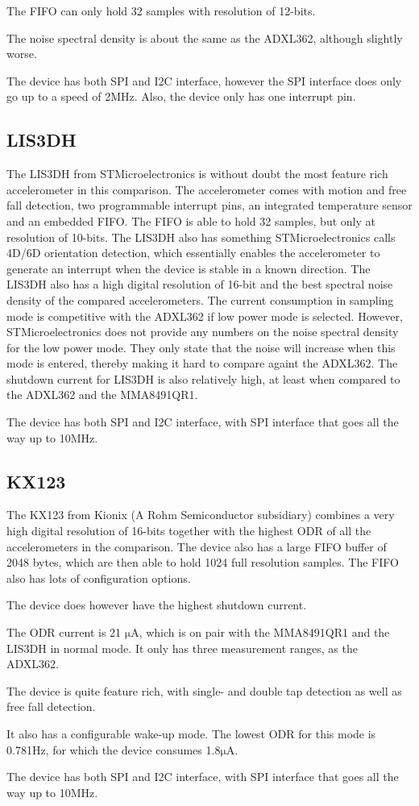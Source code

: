 The FIFO can only hold 32 samples with resolution of 12-bits. 

The noise spectral density is about the same as the ADXL362, although slightly worse.

The device has both SPI and I2C interface, however the SPI interface does only go up to a speed of 2MHz. Also, the device only has one interrupt pin.

\subsection{LIS3DH}

The LIS3DH from STMicroelectronics is without doubt the most feature rich accelerometer in this comparison. The accelerometer comes with motion and free fall detection, two programmable interrupt pins, an integrated temperature sensor and an embedded FIFO. The FIFO is able to hold 32 samples, but only at resolution of 10-bits. The LIS3DH also has something STMicroelectronics calls 4D/6D orientation detection, which essentially enables the accelerometer to generate an interrupt when the device is stable in a known direction. The LIS3DH also has a high digital resolution of 16-bit and the best spectral noise density of the compared accelerometers. The current consumption in sampling mode is competitive with the ADXL362 if low power mode is selected. However, STMicroelectronics does not provide any numbers on the noise spectral density for the low power mode. They only state that the noise will increase when this mode is entered, thereby making it hard to compare againt the ADXL362. The shutdown current for LIS3DH is also relatively high, at least when compared to the ADXL362 and the MMA8491QR1. 

The device has both SPI and I2C interface, with SPI interface that goes all the way up to 10MHz.

\subsection{KX123}

The KX123 from Kionix (A Rohm Semiconductor subsidiary) combines a very high digital resolution of 16-bits together with the highest ODR of all the accelerometers in the comparison. The device also has a large FIFO buffer of 2048 bytes, which are then able to hold 1024 full resolution samples. The FIFO also has lots of configuration options. 

The device does however have the highest shutdown current. 

The ODR current is 21 $\si{\micro\ampere}$, which is on pair with the MMA8491QR1 and the LIS3DH in normal mode. It only has three measurement ranges, as the ADXL362.

The device is quite feature rich, with single- and double tap detection as well as free fall detection.

It also has a configurable wake-up mode. The lowest ODR for this mode is 0.781Hz, for which the device consumes 1.8$\si{\micro\ampere}$. 

The device has both SPI and I2C interface, with SPI interface that goes all the way up to 10MHz.
